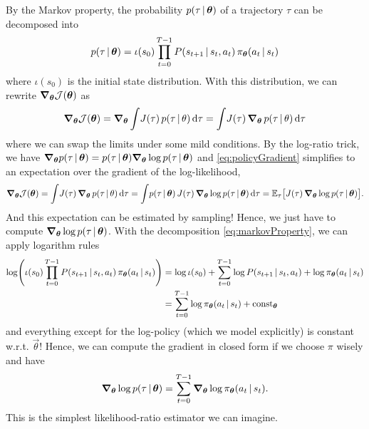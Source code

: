 				By the Markov property, the probability \(p(\tau \,\vert\, \bm{\theta})\) of a trajectory \(\tau\) can be decomposed into
				\begin{equation}
					p(\tau \,\vert\, \bm{\theta}) = \iota(s_0) \prod_{t = 0}^{T - 1} P(s_{t + 1} \,\vert\, s_t, a_t) \, \pi_{\bm{\theta}}(a_t \,\vert\, s_t)
					\label{eq:markovProperty}
				\end{equation}
				where \(\iota(s_0)\) is the initial state distribution. With this distribution, we can rewrite \( \grad_{\bm{\theta}} \mathcal{J}(\bm{\theta}) \) as
				\begin{equation}
					\grad_{\bm{\theta}} \mathcal{J}(\bm{\theta})
					= \grad_{\bm{\theta}} \int\! J(\tau) \, p(\tau \,\vert\, \theta) \dd{\tau}
					= \int\! J(\tau) \, \grad_{\bm{\theta}} \, p(\tau \,\vert\, \theta) \dd{\tau}
					\label{eq:policyGradient}
				\end{equation}
				where we can swap the limits under some mild conditions. By the log-ratio trick, we have \( \grad_{\bm{\theta}} p(\tau \,\vert\, \bm{\theta}) = p(\tau \,\vert\, \bm{\theta}) \grad_{\bm{\theta}} \log p(\tau \,\vert\, \bm{\theta}) \) and \eqref{eq:policyGradient} simplifies to an expectation over the gradient of the log-likelihood,
				\begin{equation}
					\grad_{\bm{\theta}} \mathcal{J}(\bm{\theta})
					= \int\! J(\tau) \, \grad_{\bm{\theta}} \, p(\tau \,\vert\, \theta) \dd{\tau}
					= \int\! p(\tau \,\vert\, \bm{\theta}) \, J(\tau) \, \grad_{\bm{\theta}} \log p(\tau \,\vert\, \bm{\theta}) \dd{\tau}
					= \mathbb{E}_\tau\bigl[ J(\tau) \, \grad_{\bm{\theta}} \log p(\tau \,\vert\, \bm{\theta}) \bigr].
					\label{eq:policyGradientExp}
				\end{equation}
				And this expectation can be estimated by sampling! Hence, we just have to compute \( \grad_{\bm{\theta}} \log p(\tau \,\vert\, \bm{\theta}) \). With the decomposition \eqref{eq:markovProperty}, we can apply logarithm rules
				\begin{align}
					\log( \iota(s_0) \prod_{t = 0}^{T - 1} P(s_{t + 1} \,\vert\, s_t, a_t) \, \pi_{\bm{\theta}}(a_t \,\vert\, s_t) )
					 & = \log \iota(s_0) + \sum_{t = 0}^{T - 1} \log P(s_{t + 1} \,\vert\, s_t, a_t) + \log \pi_{\bm{\theta}}(a_t \,\vert\, s_t) \\
					 & = \sum_{t = 0}^{T - 1} \log \pi_{\bm{\theta}}(a_t \,\vert\, s_t) + \operatorname{const}_{\bm{\theta}}
				\end{align}
				and everything except for the log-policy (which we model explicitly) is constant w.r.t. \(\vec{\theta}\)! Hence, we can compute the gradient in closed form if we choose \(\pi\) wisely and have
				\begin{equation}
					\grad_{\bm{\theta}} \log p(\tau \,\vert\, \bm{\theta}) = \sum_{t = 0}^{T - 1} \grad_{\bm{\theta}} \log \pi_{\bm{\theta}}(a_t \,\vert\, s_t).
					\label{eq:policyGradientSimple}
				\end{equation}
				This is the simplest likelihood-ratio estimator we can imagine.


